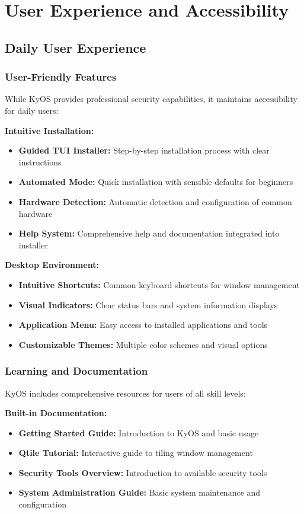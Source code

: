 \documentclass[12pt,a4paper]{article}
\begin{document}
\section{User Experience and Accessibility}

\subsection{Daily User Experience}

\subsubsection{User-Friendly Features}
While KyOS provides professional security capabilities, it maintains accessibility for daily users:

\textbf{Intuitive Installation:}
\begin{itemize}
    \item \textbf{Guided TUI Installer:} Step-by-step installation process with clear instructions
    \item \textbf{Automated Mode:} Quick installation with sensible defaults for beginners
    \item \textbf{Hardware Detection:} Automatic detection and configuration of common hardware
    \item \textbf{Help System:} Comprehensive help and documentation integrated into installer
\end{itemize}

\textbf{Desktop Environment:}
\begin{itemize}
    \item \textbf{Intuitive Shortcuts:} Common keyboard shortcuts for window management
    \item \textbf{Visual Indicators:} Clear status bars and system information displays
    \item \textbf{Application Menu:} Easy access to installed applications and tools
    \item \textbf{Customizable Themes:} Multiple color schemes and visual options
\end{itemize}

\subsubsection{Learning and Documentation}
KyOS includes comprehensive resources for users of all skill levels:

\textbf{Built-in Documentation:}
\begin{itemize}
    \item \textbf{Getting Started Guide:} Introduction to KyOS and basic usage
    \item \textbf{Qtile Tutorial:} Interactive guide to tiling window management
    \item \textbf{Security Tools Overview:} Introduction to available security tools
    \item \textbf{System Administration Guide:} Basic system maintenance and configuration
\end{itemize}
\end{document}
